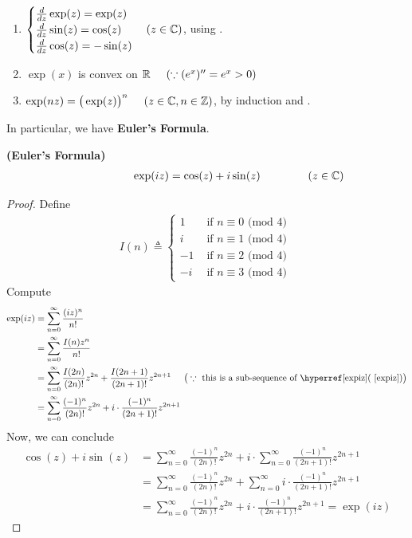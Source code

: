 \documentclass{report}
\begin{document}
\begin{mdframed}
\begin{enumerate}[label=(\alph*)]
  \item $\begin{cases}
\frac{d}{dz}\exp(z)=\exp(z)\\
  \frac{d}{dz}\sin (z)=\cos (z)\\
  \frac{d}{dz}\cos (z)=- \sin (z)
  \end{cases}(z\in\mathbb{C})$, using . 
  \item $\exp (x)$ is convex on $\mathbb{R}\hspace{0.5cm}(\because (e^x)''=e^x>0)$  
  \item $\exp (nz)=\big(\exp (z) \big)^n\hspace{0.5cm}(z\in\mathbb{C},n\in\mathbb{Z})$, by induction and . 
\end{enumerate}
In particular, we have \textbf{Euler's Formula}. 
\end{mdframed}
\begin{theorem}
\textbf{(Euler's Formula)}  
\begin{align*}
\hspace{2cm}\exp(iz)=\cos (z) + i \sin (z)\hspace{1.5cm}(z\in\mathbb{C})
\end{align*}
\end{theorem}
\begin{proof}
Define 
\begin{align*}
I(n)\triangleq \begin{cases}
  1& \text{ if $n \equiv 0$ (mod $4$) }\\
  i& \text{ if $n \equiv 1$ (mod $4$) }\\
  -1& \text{ if $n \equiv 2$ (mod $4$) }\\
  -i& \text{ if $n \equiv 3$ (mod $4$) }
\end{cases}
\end{align*}
Compute 
\begin{align}
\label{expiz}
\exp(iz)&=\sum_{n=0}^\infty \frac{(iz)^n}{n!}\notag\\ 
&=\sum_{n=0}^{\infty} \frac{I(n)z^n}{n!}\\
&=\sum_{n=0}^{\infty} \frac{I(2n)}{(2n)!}z^{2n}+\frac{I(2n+1)}{(2n+1)!}z^{2n+1}\hspace{0.5cm}\big(\because \text{ this is a sub-sequence of \myref{(}{expiz})}\big)\notag\\
&= \sum_{n=0}^{\infty} \frac{(-1)^{n}}{(2n)!}z^{2n}+ i\cdot \frac{(-1)^n}{(2n+1)!}z^{2n+1} \notag
\end{align}
Now, we can conclude 
\begin{align*}
\cos (z)+i \sin (z)&= \sum_{n=0}^{\infty}\frac{(-1)^{n}}{(2n)!}z^{2n} + i \cdot \sum_{n=0}^{\infty} \frac{(-1)^{n}}{(2n+1)!}z^{2n+1}\\
&=\sum_{n=0}^{\infty}\frac{(-1)^{n}}{(2n)!}z^{2n} +  \sum_{n=0}^{\infty} i\cdot  \frac{(-1)^{n}}{(2n+1)!}z^{2n+1} \\
&=\sum_{n=0}^{\infty}\frac{(-1)^{n}}{(2n)!}z^{2n} +  i\cdot  \frac{(-1)^{n}}{(2n+1)!}z^{2n+1} =\exp (iz)
\end{align*}
\end{proof}
\end{document}
